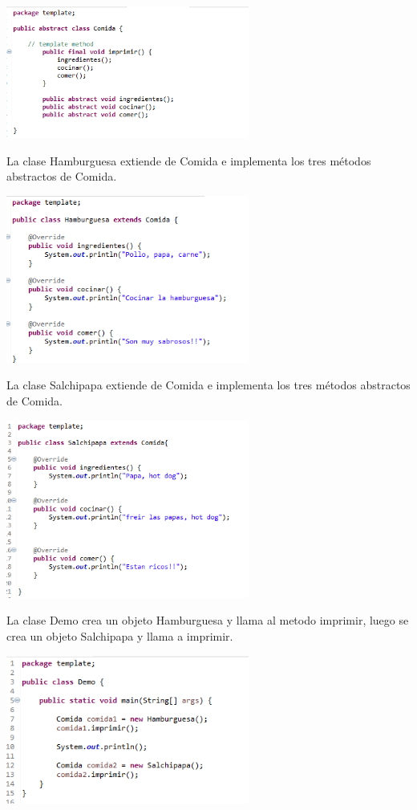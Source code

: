 \documentclass[twoside,twocolumn]{article}
\begin{document}
\includegraphics[width=8cm]{Imagenes/imagen}

La clase Hamburguesa extiende de Comida e implementa los tres métodos abstractos de Comida.

\includegraphics[width=8cm]{Imagenes/imagen2}

La clase Salchipapa extiende de Comida e implementa los tres métodos abstractos de Comida.

\includegraphics[width=8cm]{Imagenes/imagen3}

La clase Demo crea un objeto Hamburguesa y llama al metodo imprimir, luego se crea un objeto Salchipapa y llama a imprimir.

\includegraphics[width=8cm]{Imagenes/imagen4}
\end{document}
